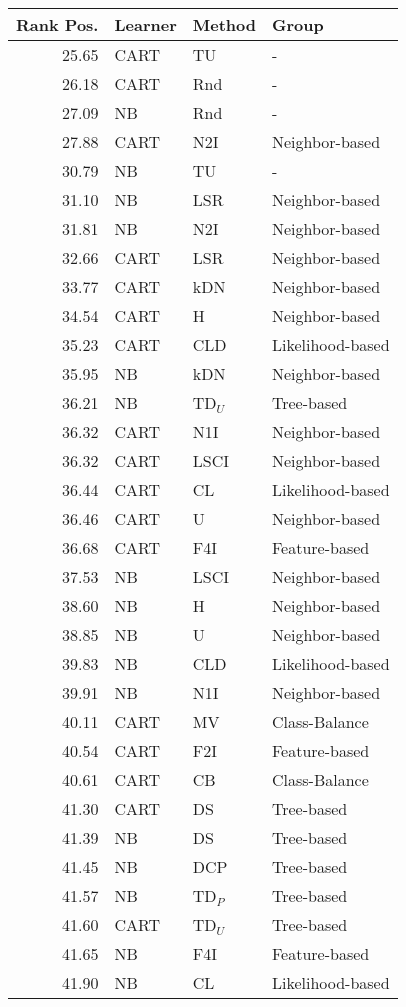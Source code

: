 \begin{tabular}{rlll}
\toprule
Rank Pos. & Learner & Method & Group \\
\midrule
25.65 & CART & TU & - \\
26.18 & CART & Rnd & - \\
27.09 & NB & Rnd & - \\
27.88 & CART & N2I & Neighbor-based \\
30.79 & NB & TU & - \\
31.10 & NB & LSR & Neighbor-based \\
31.81 & NB & N2I & Neighbor-based \\
32.66 & CART & LSR & Neighbor-based \\
33.77 & CART & kDN & Neighbor-based \\
34.54 & CART & H & Neighbor-based \\
35.23 & CART & CLD & Likelihood-based \\
35.95 & NB & kDN & Neighbor-based \\
36.21 & NB & TD$_U$ & Tree-based \\
36.32 & CART & N1I & Neighbor-based \\
36.32 & CART & LSCI & Neighbor-based \\
36.44 & CART & CL & Likelihood-based \\
36.46 & CART & U & Neighbor-based \\
36.68 & CART & F4I & Feature-based \\
37.53 & NB & LSCI & Neighbor-based \\
38.60 & NB & H & Neighbor-based \\
38.85 & NB & U & Neighbor-based \\
39.83 & NB & CLD & Likelihood-based \\
39.91 & NB & N1I & Neighbor-based \\
40.11 & CART & MV & Class-Balance \\
40.54 & CART & F2I & Feature-based \\
40.61 & CART & CB & Class-Balance \\
41.30 & CART & DS & Tree-based \\
41.39 & NB & DS & Tree-based \\
41.45 & NB & DCP & Tree-based \\
41.57 & NB & TD$_P$ & Tree-based \\
41.60 & CART & TD$_U$ & Tree-based \\
41.65 & NB & F4I & Feature-based \\
41.90 & NB & CL & Likelihood-based \\

\end{tabular}
